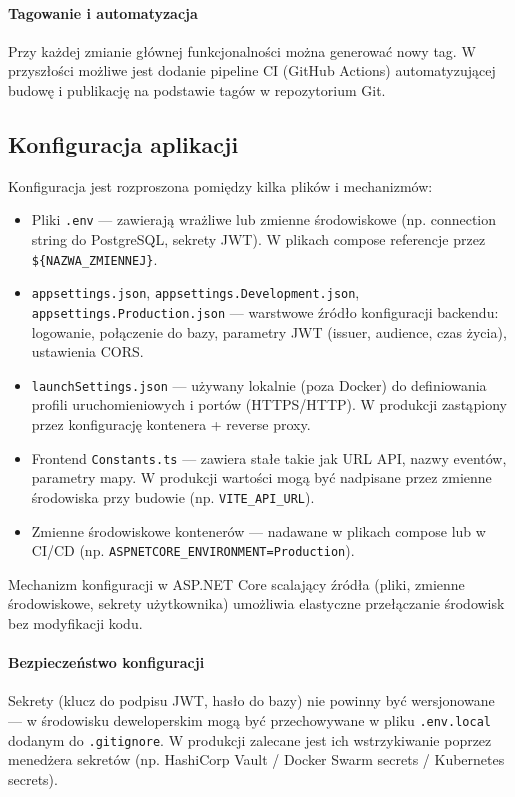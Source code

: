 \paragraph{Tagowanie i automatyzacja} Przy każdej zmianie głównej funkcjonalności można generować nowy tag. W przyszłości możliwe jest dodanie pipeline CI (GitHub Actions) automatyzującej budowę i publikację na podstawie tagów w repozytorium Git.

\subsection{Konfiguracja aplikacji}
\noindent

Konfiguracja jest rozproszona pomiędzy kilka plików i mechanizmów:
\begin{itemize}
    \item Pliki \texttt{.env} — zawierają wrażliwe lub zmienne środowiskowe (np. connection string do PostgreSQL, sekrety JWT). W plikach compose referencje przez \texttt{\$\{NAZWA\_ZMIENNEJ\}}.
    \item \texttt{appsettings.json}, \texttt{appsettings.Development.json}, \texttt{appsettings.Production.json} — warstwowe źródło konfiguracji backendu: logowanie, połączenie do bazy, parametry JWT (issuer, audience, czas życia), ustawienia CORS.
    \item \texttt{launchSettings.json} — używany lokalnie (poza Docker) do definiowania profili uruchomieniowych i portów (HTTPS/HTTP). W produkcji zastąpiony przez konfigurację kontenera + reverse proxy.
    \item Frontend \texttt{Constants.ts} — zawiera stałe takie jak URL API, nazwy eventów, parametry mapy. W produkcji wartości mogą być nadpisane przez zmienne środowiska przy budowie (np. \texttt{VITE\_API\_URL}).
    \item Zmienne środowiskowe kontenerów — nadawane w plikach compose lub w CI/CD \linebreak (np. \texttt{ASPNETCORE\_ENVIRONMENT=Production}).
\end{itemize}
\bigskip
Mechanizm konfiguracji w ASP.NET Core scalający źródła (pliki, zmienne środowiskowe, sekrety użytkownika) umożliwia elastyczne przełączanie środowisk bez modyfikacji kodu.

\paragraph{Bezpieczeństwo konfiguracji}

Sekrety (klucz do podpisu JWT, hasło do bazy) nie powinny być wersjonowane --- w środowisku deweloperskim mogą być przechowywane w pliku \texttt{.env.local} dodanym do \texttt{.gitignore}. W produkcji zalecane jest ich wstrzykiwanie poprzez menedżera sekretów (np. HashiCorp Vault / Docker Swarm secrets / Kubernetes secrets).

